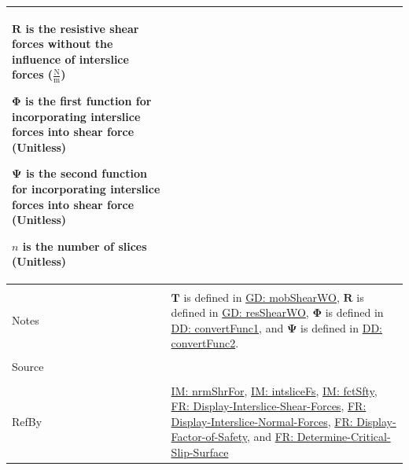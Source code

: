 \documentclass[12pt]{article}
\begin{document}
\begin{minipage}{\textwidth}
\begin{tabular}{>{\raggedright}p{}>{\raggedright\arraybackslash}p{}}
\begin{symbDescription}
                        \item{$\mathbf{R}$ is the resistive shear forces without the influence of interslice forces ($\frac{\text{N}}{\text{m}}$)}
                        \item{$\mathbf{Φ}$ is the first function for incorporating interslice forces into shear force (Unitless)}
                        \item{$\mathbf{Ψ}$ is the second function for incorporating interslice forces into shear force (Unitless)}
                        \item{$n$ is the number of slices (Unitless)}
                        \end{symbDescription}
          \\ \midrule \\
          Notes & $\mathbf{T}$ is defined in \hyperref[GD:mobShearWO]{GD: mobShearWO}, $\mathbf{R}$ is defined in \hyperref[GD:resShearWO]{GD: resShearWO}, $\mathbf{Φ}$ is defined in \hyperref[DD:convertFunc1]{DD: convertFunc1}, and $\mathbf{Ψ}$ is defined in \hyperref[DD:convertFunc2]{DD: convertFunc2}.
          \\ \midrule \\
          Source & \cite{chen2005}
          \\ \midrule \\
          RefBy & \hyperref[IM:nrmShrFor]{IM: nrmShrFor}, \hyperref[IM:intsliceFs]{IM: intsliceFs}, \hyperref[IM:fctSfty]{IM: fctSfty}, \hyperref[displayShear]{FR: Display-Interslice-Shear-Forces}, \hyperref[displayNormal]{FR: Display-Interslice-Normal-Forces}, \hyperref[displayFS]{FR: Display-Factor-of-Safety}, and \hyperref[determineCritSlip]{FR: Determine-Critical-Slip-Surface}
          \\ \bottomrule
          \end{tabular}
          \end{minipage}
\end{document}
